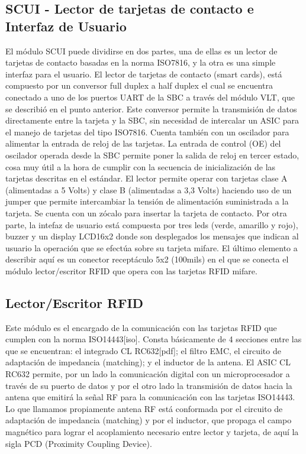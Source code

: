 \subsection{SCUI - Lector de tarjetas de contacto e Interfaz de Usuario}
El módulo SCUI puede dividirse en dos partes, una de ellas es un lector de tarjetas de contacto basadas en la norma ISO7816, y la otra es una simple interfaz para el usuario.
El lector de tarjetas de contacto (smart cards), está compuesto por un conversor full duplex a half duplex el cual se encuentra conectado a uno de los puertos UART de la SBC a través del módulo VLT, que se describió en el punto anterior. Este conversor permite la transmisión de datos directamente entre la tarjeta y la SBC, sin necesidad de intercalar un ASIC para el manejo de tarjetas del tipo ISO7816. Cuenta también con un oscilador para alimentar la entrada de reloj de las tarjetas. La entrada de control (OE) del oscilador operada desde la SBC permite poner la salida de reloj en tercer estado, cosa muy útil a la hora de cumplir con la secuencia de inicialización de las tarjetas descritas en el estándar. El lector permite operar con tarjetas clase A (alimentadas a 5 Volts) y clase B (alimentadas a 3,3 Volts) haciendo uso de un jumper que permite intercambiar la tensión de alimentación suministrada a la tarjeta. Se cuenta con un zócalo para insertar la tarjeta de contacto.
Por otra parte, la intefaz de usuario está compuesta por tres leds (verde, amarillo y rojo), buzzer y un display LCD16x2 donde son desplegados los mensajes que indican al usuario la operación que se efectúa sobre su tarjeta mifare.
El último elemento a describir aquí es un conector receptáculo 5x2 (100mils) en el que se conecta el módulo lector/escritor RFID que opera con las tarjetas RFID mifare.

\subsection{Lector/Escritor RFID}
Este módulo es el encargado de la comunicación con las tarjetas RFID que cumplen con la norma ISO14443[iso]. Consta básicamente de 4 secciones entre las que se encuentran: el integrado CL RC632[pdf]; el filtro EMC, el circuito de adaptación de impedancia (matching); y el inductor de la antena. 
El ASIC CL RC632 permite, por un lado la comunicación digital con un microprocesador a través de su puerto de datos y por el otro lado la transmisión de datos hacia la antena que emitirá la señal RF para la comunicación con las tarjetas ISO14443. 
Lo que llamamos propiamente antena RF está conformada por el circuito de adaptación de impedancia (matching) y por el inductor, que propaga el campo magnético para lograr el acoplamiento necesario entre lector y tarjeta, de aquí la sigla PCD (Proximity Coupling Device).


